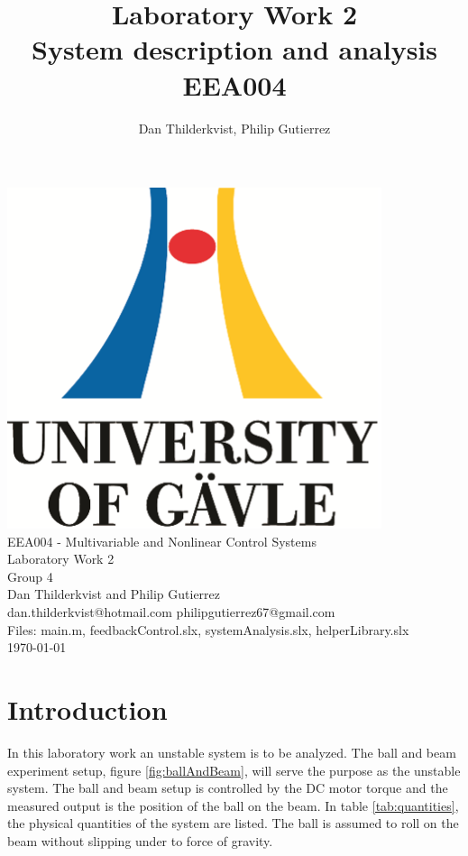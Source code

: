 \documentclass[a4paper, titlepage]{article}
\title{Laboratory Work 2\\
System description and analysis\\
\large EEA004}
\author{Dan Thilderkvist, Philip Gutierrez}
\begin{document}
\begin{titlepage}
\begin{center}
\vspace*{1cm}
\includegraphics[scale=1.0]{../figures/hig_logo_eng.png}\\
\vspace{1.5cm}
\large EEA004 - Multivariable and Nonlinear Control Systems\\
\large Laboratory Work 2\\
\vspace{1.5cm}
Group 4\\
Dan Thilderkvist and Philip Gutierrez\\
dan.thilderkvist@hotmail.com philipgutierrez67@gmail.com\\
Files: main.m, feedbackControl.slx, systemAnalysis.slx, helperLibrary.slx\\
\vspace{1cm}
\today
\end{center}
\end{titlepage}

\tableofcontents
\clearpage

\section{Introduction}
In this laboratory work an unstable system is to be analyzed.
The ball and beam experiment setup, figure \ref{fig:ballAndBeam}, will serve the purpose as the unstable system.
The ball and beam setup is controlled by the DC motor torque and the measured output is the position of the ball on the beam.
In table \ref{tab:quantities}, the physical quantities of the system are listed.
The ball is assumed to roll on the beam without slipping under to force of gravity.
\end{document}
